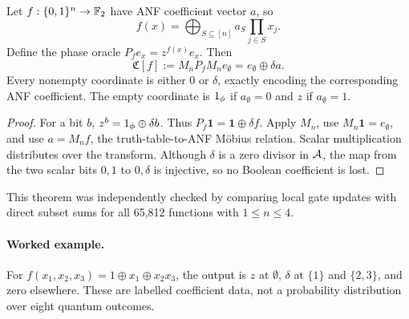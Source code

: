 \begin{theorem}\label{thm:phaseanf}
Let $f:\{0,1\}^n\to\mathbb F_2$ have ANF coefficient vector $a$, so
\begin{equation}
 f(x)=\bigoplus_{S\subseteq[n]} a_S\prod_{j\in S}x_j.
\end{equation}
Define the phase oracle $P_f e_x=z^{f(x)}e_x$. Then
\begin{equation}\label{eq:main}
 \mathfrak C[f]:=M_nP_fM_ne_\emptyset
 =e_\emptyset\oplus\delta a.
\end{equation}
Every nonempty coordinate is either $0$ or $\delta$, exactly encoding the corresponding ANF coefficient. The empty coordinate is $1_{\phi}$ if $a_\emptyset=0$ and $z$ if $a_\emptyset=1$.
\end{theorem}
\begin{proof}
For a bit $b$, $z^b=1_{\phi}\oplus\delta b$. Thus $P_f\mathbf1=\mathbf1\oplus\delta f$. Apply $M_n$, use $M_n\mathbf1=e_\emptyset$, and use $a=M_nf$, the truth-table-to-ANF M\"obius relation. Scalar multiplication distributes over the transform. Although $\delta$ is a zero divisor in $\mathcal A$, the map from the two scalar bits $0,1$ to $0,\delta$ is injective, so no Boolean coefficient is lost.
\end{proof}
This theorem was independently checked by comparing local gate updates with direct subset sums for all 65,812 functions with $1\le n\le4$.

\paragraph{Worked example.}
For $f(x_1,x_2,x_3)=1\oplus x_1\oplus x_2x_3$, the output is $z$ at $\emptyset$, $\delta$ at $\{1\}$ and $\{2,3\}$, and zero elsewhere. These are labelled coefficient data, not a probability distribution over eight quantum outcomes.

